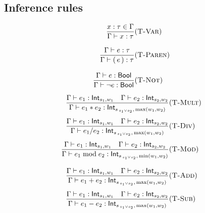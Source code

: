 \subsection*{Inference rules}
\begin{multicols}{2}

  \[
    \begin{aligned}
      \frac{x:\tau\in\Gamma}{\Gamma \vdash x : \tau}
       & (\textsc{T-Var})   \\[2ex]
      \frac{\Gamma \vdash e : \tau}{\Gamma \vdash (\,e\,) : \tau}
       & (\textsc{T-Paren}) \\[2ex]
      \frac{\Gamma \vdash e : \mathsf{Bool}}
      {\Gamma \vdash \neg e : \mathsf{Bool}}
       & (\textsc{T-Not})
    \end{aligned}
  \]

  \[
    \begin{aligned}
      \frac{\Gamma \vdash e_1 : \mathsf{Int}_{s_1,w_1}
      \quad
      \Gamma \vdash e_2 : \mathsf{Int}_{s_2,w_2}}
      {\Gamma \vdash e_1 * e_2 : \mathsf{Int}_{s_{\,s_1\lor s_2},\,\max(w_1, w_2)}}
       & (\textsc{T-Mult}) \\[1ex]
      \frac{\Gamma \vdash e_1 : \mathsf{Int}_{s_1,w_1}
      \quad
      \Gamma \vdash e_2 : \mathsf{Int}_{s_2,w_2}}
      {\Gamma \vdash e_1 / e_2 : \mathsf{Int}_{s_{\,s_1\lor s_2},\,\max(w_1, w_2)}}
       & (\textsc{T-Div})  \\[1ex]
      \frac{\Gamma \vdash e_1 : \mathsf{Int}_{s_1,w_1}
      \quad
      \Gamma \vdash e_2 : \mathsf{Int}_{s_2,w_2}}
      {\Gamma \vdash e_1 \bmod e_2 : \mathsf{Int}_{s_{\,s_1\lor s_2},\,\min(w_1, w_2)}}
       & (\textsc{T-Mod})  \\[2ex]
      \frac{\Gamma \vdash e_1 : \mathsf{Int}_{s_1,w_1}
      \quad
      \Gamma \vdash e_2 : \mathsf{Int}_{s_2,w_2}}
      {\Gamma \vdash e_1 + e_2 : \mathsf{Int}_{s_{\,s_1\lor s_2},\,\max(w_1, w_2)}}
       & (\textsc{T-Add})  \\[1ex]
      \frac{\Gamma \vdash e_1 : \mathsf{Int}_{s_1,w_1}
      \quad
      \Gamma \vdash e_2 : \mathsf{Int}_{s_2,w_2}}
      {\Gamma \vdash e_1 - e_2 : \mathsf{Int}_{s_{\,s_1\lor s_2},\,\max(w_1, w_2)}}
       & (\textsc{T-Sub})
    \end{aligned}
  \]


\end{multicols}
